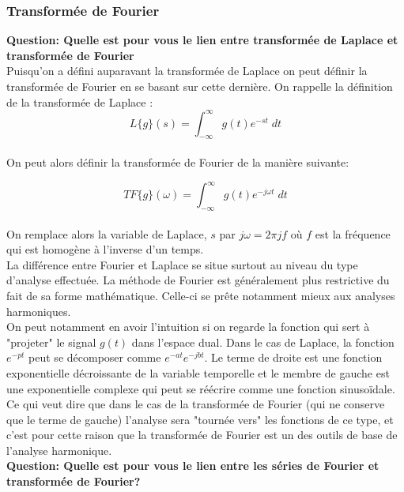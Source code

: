 \documentclass[11pt,a4paper]{article}
\begin{document}
\subsubsection{Transformée de Fourier}

\textbf{Question: Quelle est pour vous le lien entre transformée de Laplace et transformée de Fourier}\\

Puisqu'on a défini auparavant la transformée de Laplace on peut définir la transformée de Fourier en se basant sur cette dernière. On rappelle la définition de la transformée de Laplace :\\

\[L\{ g \}(s) = \int^{\infty}_{-\infty} g(t) e^{-st} \; dt\]\\ 

On peut alors définir la transformée de Fourier de la manière suivante:

\[TF\{ g \}(\omega) = \int^{\infty}_{-\infty} g(t) e^{-j\omega t} \; dt\]\\

On remplace alors la variable de Laplace, $s$ par  $j \omega = 2 \pi j f$ où $f$  est la fréquence qui est homogène à l'inverse d'un temps.\\

La différence entre Fourier et Laplace se situe surtout au niveau du type  d'analyse effectuée. La méthode de Fourier est généralement plus restrictive du fait de sa forme mathématique. Celle-ci se prête notamment mieux aux analyses harmoniques.\\

On peut notamment en avoir l'intuition si on regarde la fonction qui sert à "projeter" le signal $g(t)$ dans l'espace dual. Dans le cas de Laplace, la fonction $e^{-pt}$ peut se décomposer comme $e^{-at}e^{-jbt}$. Le terme de droite est une fonction exponentielle décroissante de la variable temporelle et le membre de gauche est une exponentielle complexe qui peut se réécrire comme une fonction sinusoïdale. Ce qui veut dire que dans le cas de la transformée de Fourier (qui ne conserve que le terme de gauche) l'analyse sera "tournée vers" les fonctions de ce type, et c'est pour cette raison que la transformée de Fourier est un des outils de base de l'analyse harmonique. \\

\textbf{Question: Quelle est pour vous le lien entre les séries de Fourier et transformée de Fourier?} \\
\end{document}
